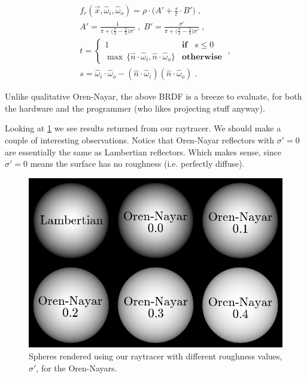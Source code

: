 \documentclass[a4paper, twocolumn]{article}
\begin{document}
                \vspace{-1em}

                \begin{equation} \label{eq:improved_oren-nayar_model}
                    \begin{split}
                        f_r(\vec{x}, \hat{\omega}_i, \hat{\omega}_o) = \rho \cdot \Big(A' + \frac{s}{t} \cdot B'\Big) \; ,\\
                        A' = \frac{1}{\pi + \big(\frac{\pi}{2} - \frac{2}{3}\big) \sigma'} \; , \; B' = \frac{\sigma'}{\pi + \big(\frac{\pi}{2} - \frac{2}{3}\big) \sigma'} \; ,\\
                        t = \begin{cases}
                            1 & \textbf{if}\;\;\; s \leq 0\\
                            \max\, \{\hat{n} \cdot \hat{\omega}_i, \hat{n} \cdot \hat{\omega}_o\} & \textbf{otherwise}
                        \end{cases} \; ,\\
                        s = \hat{\omega}_i \cdot \hat{\omega}_o - (\hat{n} \cdot \hat{\omega}_i)(\hat{n} \cdot \hat{\omega}_o) \; .
                    \end{split}
                \end{equation}

                Unlike qualitative Oren-Nayar, the above BRDF is a breeze to evaluate, for both the hardware and the programmer (who likes projecting stuff anyway).

                Looking at \cref{fig:roughness} we see results returned from our raytracer. We should make a couple of interesting observations. Notice that Oren-Nayar reflectors with \(\sigma' = 0\) are essentially the same as Lambertian reflectors. Which makes sense, since \(\sigma' = 0\) means the surface has no roughness (i.e. perfectly diffuse).

                \begin{figure}[ht]
                    \centering
                    \includegraphics[width=\linewidth]{share/roughness.png}
                    \caption{Spheres rendered using our raytracer with different roughness values, \(\sigma'\), for the Oren-Nayars.}
                    \label{fig:roughness}
                \end{figure}
\end{document}
